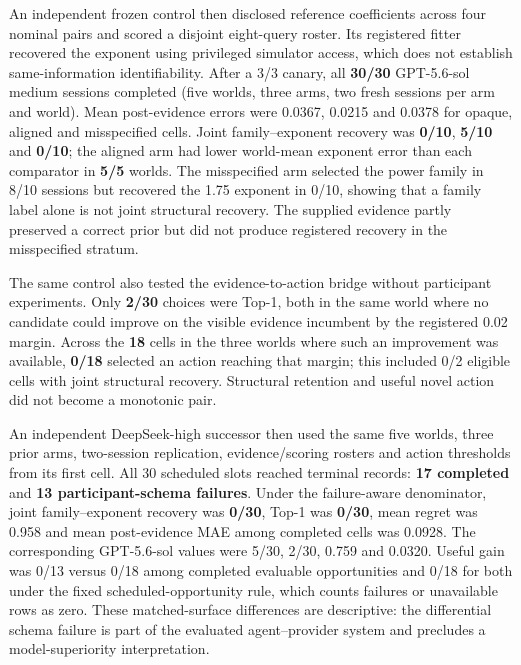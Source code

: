 \documentclass[10pt,twocolumn]{article}
\begin{document}
An independent frozen control then disclosed reference coefficients
across four nominal pairs and scored a disjoint eight-query roster. Its
registered fitter recovered the exponent using privileged simulator
access, which does not establish same-information identifiability. After
a 3/3 canary, all \textbf{30/30} GPT-5.6-sol medium sessions completed
(five worlds, three arms, two fresh sessions per arm and world). Mean
post-evidence errors were 0.0367, 0.0215 and 0.0378 for opaque, aligned
and misspecified cells. Joint family--exponent recovery was
\textbf{0/10}, \textbf{5/10} and \textbf{0/10}; the aligned arm had
lower world-mean exponent error than each comparator in \textbf{5/5}
worlds. The misspecified arm selected the power family in 8/10 sessions
but recovered the 1.75 exponent in 0/10, showing that a family label
alone is not joint structural recovery. The supplied evidence partly
preserved a correct prior but did not produce registered recovery in the
misspecified stratum.

The same control also tested the evidence-to-action bridge without
participant experiments. Only \textbf{2/30} choices were Top-1, both in
the same world where no candidate could improve on the visible evidence
incumbent by the registered 0.02 margin. Across the \textbf{18} cells in
the three worlds where such an improvement was available, \textbf{0/18}
selected an action reaching that margin; this included 0/2 eligible
cells with joint structural recovery. Structural retention and useful
novel action did not become a monotonic pair.

An independent DeepSeek-high successor then used the same five worlds,
three prior arms, two-session replication, evidence/scoring rosters and
action thresholds from its first cell. All 30 scheduled slots reached
terminal records: \textbf{17 completed} and \textbf{13
participant-schema failures}. Under the failure-aware denominator, joint
family--exponent recovery was \textbf{0/30}, Top-1 was \textbf{0/30},
mean regret was 0.958 and mean post-evidence MAE among completed cells
was 0.0928. The corresponding GPT-5.6-sol values were 5/30, 2/30, 0.759
and 0.0320. Useful gain was 0/13 versus 0/18 among completed evaluable
opportunities and 0/18 for both under the fixed scheduled-opportunity
rule, which counts failures or unavailable rows as zero. These
matched-surface differences are descriptive: the differential schema
failure is part of the evaluated agent--provider system and precludes a
model-superiority interpretation.
\end{document}
